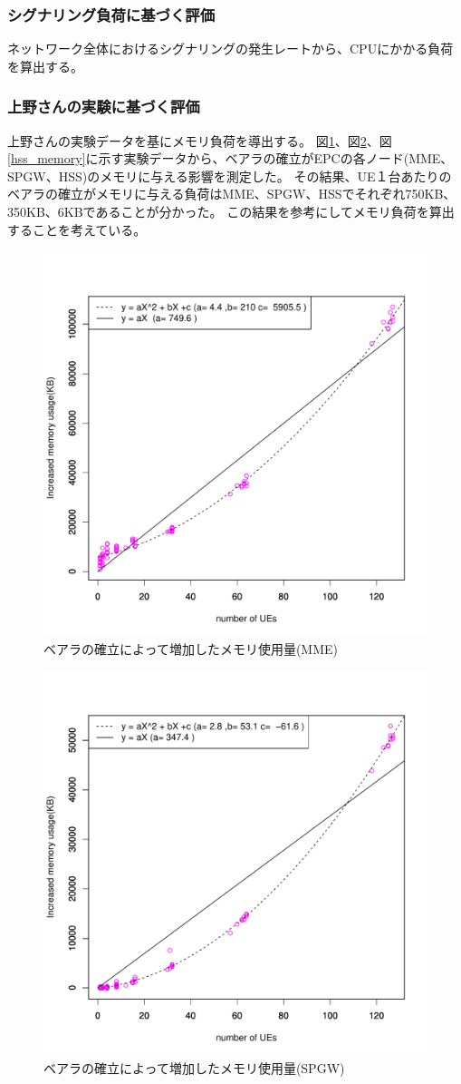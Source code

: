 \documentclass[a4j]{ujarticle}
\begin{document}
\subsubsection{シグナリング負荷に基づく評価}
\label{sec:cpu}
ネットワーク全体におけるシグナリングの発生レートから、CPUにかかる負荷を算出する。

\subsubsection{上野さんの実験に基づく評価}
\label{sec:memory}
上野さんの実験データを基にメモリ負荷を導出する。
図\ref{mme_memory}、図\ref{spgw_memory}、図\ref{hss_memory}に示す実験データから、ベアラの確立がEPCの各ノード(MME、SPGW、HSS)のメモリに与える影響を測定した。
その結果、UE１台あたりのベアラの確立がメモリに与える負荷はMME、SPGW、HSSでそれぞれ750KB、350KB、6KBであることが分かった。
この結果を参考にしてメモリ負荷を算出することを考えている。

\begin{figure}[htbp]
	\centering
	\includegraphics[width=0.7\hsize]{mme_memory.pdf}
  \caption{ベアラの確立によって増加したメモリ使用量(MME)}
	\label{mme_memory}
\end{figure}

\begin{figure}[htbp]
	\centering
	\includegraphics[width=0.7\hsize]{spgw_memory.pdf}
  \caption{ベアラの確立によって増加したメモリ使用量(SPGW)}
	\label{spgw_memory}
\end{figure}
\end{document}
